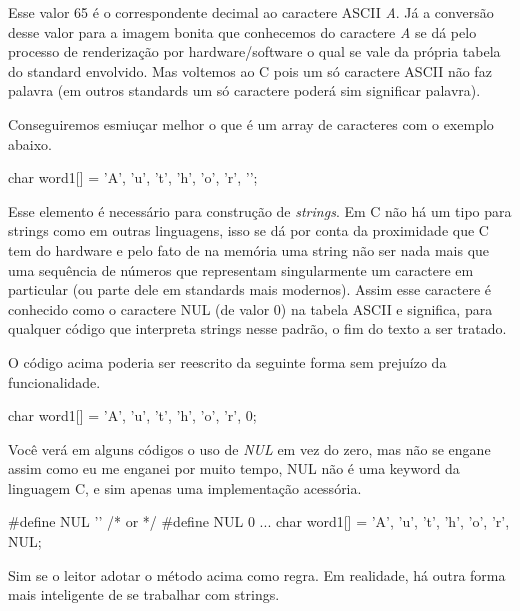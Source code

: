 
Esse valor 65 é o correspondente decimal ao caractere ASCII \textit{A}. Já a
conversão desse valor para a imagem bonita que conhecemos do caractere
\textit{A} se dá pelo processo de renderização por hardware/software o qual se
vale da própria tabela do standard envolvido. Mas voltemos ao C pois um só
caractere ASCII não faz palavra (em outros standards um só caractere poderá sim
significar palavra).

Conseguiremos esmiuçar melhor o que é um array de caracteres com o exemplo
abaixo.

\begin{ccode}
  char word1[] = {'A', 'u', 't', 'h', 'o', 'r', '\0'};
\end{ccode}


Esse elemento é necessário para construção de \textit{strings}. Em C não há um
tipo para strings como em outras linguagens, isso se dá por conta da
proximidade que C tem do hardware e pelo fato de na memória uma string não ser
nada mais que uma sequência de números que representam singularmente um
caractere em particular (ou parte dele em standards mais modernos). Assim esse
caractere é conhecido como o caractere NUL (de valor 0) na tabela ASCII e
significa, para qualquer código que interpreta strings nesse padrão, o fim do
texto a ser tratado.

O código acima poderia ser reescrito da seguinte forma sem prejuízo da
funcionalidade.

\begin{ccode}
  char word1[] = {'A', 'u', 't', 'h', 'o', 'r', 0};
\end{ccode}

Você verá em alguns códigos o uso de \textit{NUL} em vez do zero, mas não se
engane assim como eu me enganei por muito tempo, NUL não é uma keyword da
linguagem C, e sim apenas uma implementação acessória.

\begin{ccode}
  #define NUL '\0'
  /* or */
  #define NUL 0
  ...
  char word1[] = {'A', 'u', 't', 'h', 'o', 'r', NUL};
\end{ccode}


Sim se o leitor adotar o método acima como regra. Em realidade, há outra forma
mais inteligente de se trabalhar com strings.

